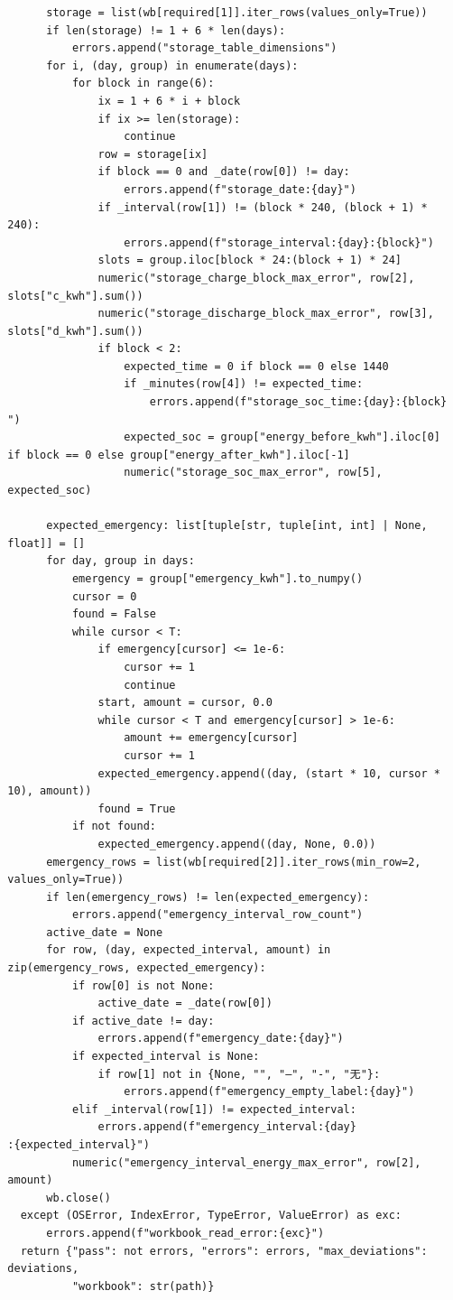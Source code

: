 \begin{verbatim}
        storage = list(wb[required[1]].iter_rows(values_only=True))
        if len(storage) != 1 + 6 * len(days):
            errors.append("storage_table_dimensions")
        for i, (day, group) in enumerate(days):
            for block in range(6):
                ix = 1 + 6 * i + block
                if ix >= len(storage):
                    continue
                row = storage[ix]
                if block == 0 and _date(row[0]) != day:
                    errors.append(f"storage_date:{day}")
                if _interval(row[1]) != (block * 240, (block + 1) *
  240):
                    errors.append(f"storage_interval:{day}:{block}")
                slots = group.iloc[block * 24:(block + 1) * 24]
                numeric("storage_charge_block_max_error", row[2],
  slots["c_kwh"].sum())
                numeric("storage_discharge_block_max_error", row[3],
  slots["d_kwh"].sum())
                if block < 2:
                    expected_time = 0 if block == 0 else 1440
                    if _minutes(row[4]) != expected_time:
                        errors.append(f"storage_soc_time:{day}:{block}
  ")
                    expected_soc = group["energy_before_kwh"].iloc[0]
  if block == 0 else group["energy_after_kwh"].iloc[-1]
                    numeric("storage_soc_max_error", row[5],
  expected_soc)

        expected_emergency: list[tuple[str, tuple[int, int] | None,
  float]] = []
        for day, group in days:
            emergency = group["emergency_kwh"].to_numpy()
            cursor = 0
            found = False
            while cursor < T:
                if emergency[cursor] <= 1e-6:
                    cursor += 1
                    continue
                start, amount = cursor, 0.0
                while cursor < T and emergency[cursor] > 1e-6:
                    amount += emergency[cursor]
                    cursor += 1
                expected_emergency.append((day, (start * 10, cursor *
  10), amount))
                found = True
            if not found:
                expected_emergency.append((day, None, 0.0))
        emergency_rows = list(wb[required[2]].iter_rows(min_row=2,
  values_only=True))
        if len(emergency_rows) != len(expected_emergency):
            errors.append("emergency_interval_row_count")
        active_date = None
        for row, (day, expected_interval, amount) in
  zip(emergency_rows, expected_emergency):
            if row[0] is not None:
                active_date = _date(row[0])
            if active_date != day:
                errors.append(f"emergency_date:{day}")
            if expected_interval is None:
                if row[1] not in {None, "", "—", "-", "无"}:
                    errors.append(f"emergency_empty_label:{day}")
            elif _interval(row[1]) != expected_interval:
                errors.append(f"emergency_interval:{day}
  :{expected_interval}")
            numeric("emergency_interval_energy_max_error", row[2],
  amount)
        wb.close()
    except (OSError, IndexError, TypeError, ValueError) as exc:
        errors.append(f"workbook_read_error:{exc}")
    return {"pass": not errors, "errors": errors, "max_deviations":
  deviations,
            "workbook": str(path)}



\end{verbatim}
